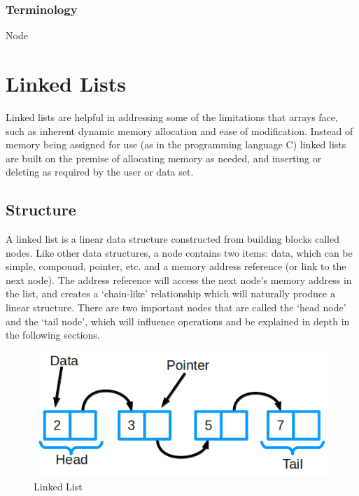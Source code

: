 \documentclass[hidelinks,11pt]{article}
\begin{document}
\subsubsection{Terminology}
Node\\
\section{Linked Lists}
Linked lists are helpful in addressing some of the limitations that arrays face, such as inherent dynamic memory allocation and ease of modification. Instead of memory being assigned for use (as in the programming language C) linked lists are built on the premise of allocating memory as needed, and inserting or deleting as required by the user or data set.
\subsection{Structure}
A linked list is a linear data structure constructed from building blocks called nodes. Like other data structures, a node contains two items: data, which can be simple, compound, pointer, etc. and a memory address reference (or link to the next node). The address reference will access the next node's memory address in the list, and creates a `chain-like' relationship which will naturally produce a linear structure. There are two important nodes that are called the `head node' and the `tail node', which will influence operations and be explained in depth in the following sections.
\begin{figure}[b]
    \centering
    \includegraphics[scale=0.5]{linkedlist.png}
    \caption{Linked List}
\end{figure}
\end{document}

